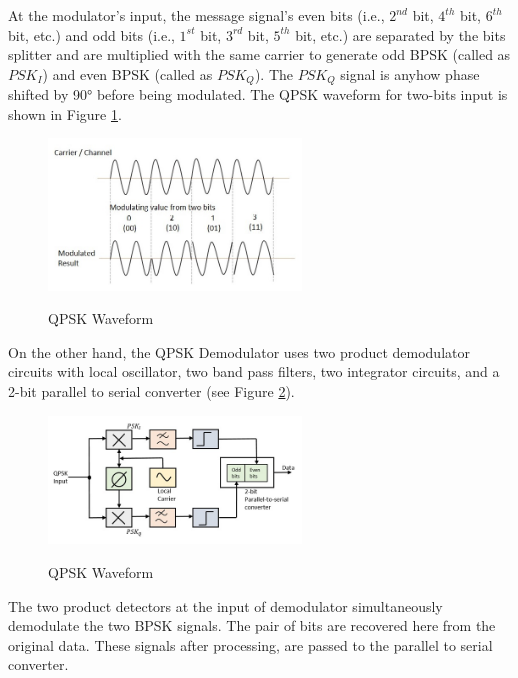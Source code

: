 \documentclass{article}
\begin{document}
	At the modulator’s input, the message signal’s even bits (i.e., $2^{nd}$ bit, $4^{th}$ bit, $6^{th}$ bit, etc.) and odd bits (i.e., $1^{st}$ bit, $3^{rd}$ bit, $5^{th}$ bit, etc.) are separated by the bits splitter and are multiplied with the same carrier to generate odd BPSK (called as $PSK_I$) and even BPSK (called as $PSK_Q$). The $PSK_Q$ signal is anyhow phase shifted by 90° before being modulated. The QPSK waveform for two-bits input is shown in Figure \ref{fig:qpsk_mo_show}. 
	
	\begin{figure}[h]
		\caption{QPSK Waveform}
		\centering
		\includegraphics[width=0.6\textwidth]{imgs/qpsk_waveform}
		\label{fig:qpsk_mo_show}
	\end{figure}
	
	On the other hand, the QPSK Demodulator uses two product demodulator circuits with local oscillator, two band pass filters, two integrator circuits, and a 2-bit parallel to serial converter (see Figure \ref{fig:qpsk_demo}).
	
	\begin{figure}[h]
		\caption{QPSK Waveform}
		\centering
		\includegraphics[width=0.6\textwidth]{imgs/qpsk_demodulator}
		\label{fig:qpsk_demo}
	\end{figure}

	The two product detectors at the input of demodulator simultaneously demodulate the two BPSK signals. The pair of bits are recovered here from the original data. These signals after processing, are passed to the parallel to serial converter.
\end{document}
